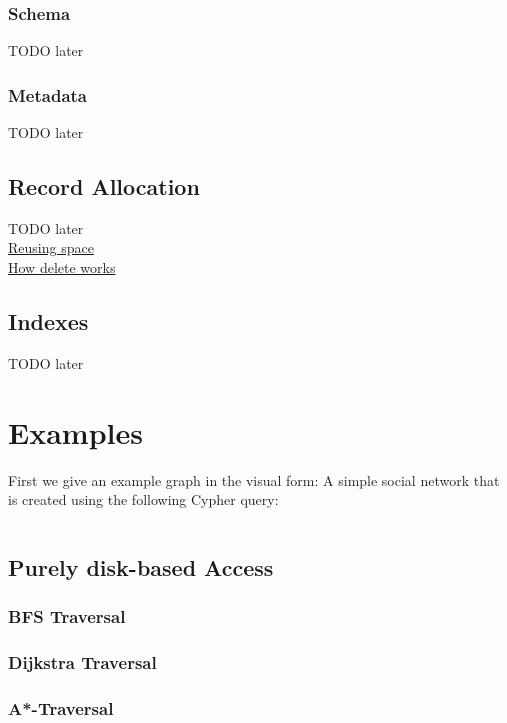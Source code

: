 \documentclass[a4paper,10pt]{article}
\begin{document}
            
    \subsubsection{Schema}
            TODO later
    \subsubsection{Metadata}
                TODO later
        
    \subsection{Record Allocation}
            TODO later \\
        \href{https://neo4j.com/docs/operations-manual/current/performance/space-reuse/\#space-reuse}{Reusing space} \\
\href{https://neo4j.com/developer/kb/how-deletes-workin-neo4j/}{How delete works} \\
    

    \subsection{Indexes}
        TODO later
    

\section{Examples}
First we give an example graph in the visual form: A simple social network that is created using the following Cypher query:
\inputminted{Cypher}{code/example_query.cy}


\subsection{Purely disk-based Access}
    \subsubsection{BFS Traversal}

    \subsubsection{Dijkstra Traversal}

    \subsubsection{A*-Traversal}
\end{document}

